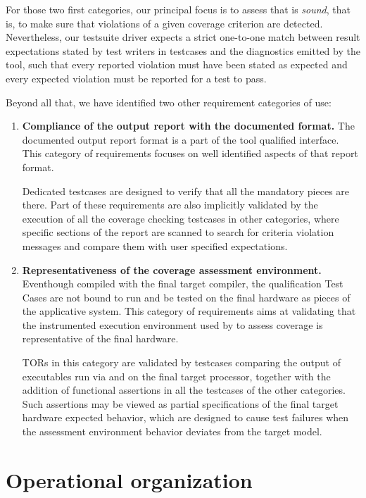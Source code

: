 \documentclass {report}
\begin{document}
For those two first categories, our principal focus is to assess that \xcov{}
is \emph{sound}, that is, to make sure that violations of a given coverage
criterion are detected.
%
Nevertheless, our testsuite driver expects a strict one-to-one match between
result expectations stated by test writers in testcases and the diagnostics
emitted by the tool, such that every reported violation must have been stated
as expected and every expected violation must be reported for a test to pass.

Beyond all that, we have identified two other requirement categories of use:

\begin{enumerate}
\item \textbf{Compliance of the output report with the documented format.}
%
The documented output report format is a part of the tool qualified interface.
% 
This category of requirements focuses on well identified aspects of that
report format.

Dedicated testcases are designed to verify that all the mandatory pieces are
there.
%
Part of these requirements are also implicitly validated by the execution of
all the coverage checking testcases in other categories, where specific
sections of the report are scanned to search for criteria violation messages
and compare them with user specified expectations.

\item \textbf{Representativeness of the coverage assessment environment.}
%
Eventhough compiled with the final target compiler, the qualification Test
Cases are not bound to run and be tested on the final hardware as pieces of
the applicative system.
%
This category of requirements aims at validating that the instrumented
execution environment used by \xcov{} to assess coverage is representative of
the final hardware.

TORs in this category are validated by testcases comparing the output of
executables run via \xcov{} and on the final target processor, together with
the addition of functional assertions in all the testcases of the other
categories.
%
Such assertions may be viewed as partial specifications of the final target
hardware expected behavior, which are designed to cause test failures when the
assessment environment behavior deviates from the target model.
\end{enumerate}

\section{Operational organization}
\end{document}
